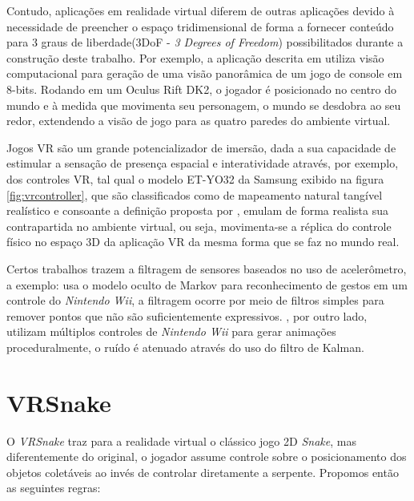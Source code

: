 \documentclass[conference]{IEEEtran}
\begin{document}
 Contudo, aplicações em realidade virtual diferem de outras aplicações devido à necessidade de preencher o espaço tridimensional de forma a fornecer conteúdo para 3 graus de liberdade(3DoF - \textit{3 Degrees of Freedom}) possibilitados durante a construção deste trabalho. Por exemplo, a aplicação descrita em \cite{zund2015unfolding} utiliza visão computacional para geração de uma visão panorâmica de um jogo de console em 8-bits. Rodando em um Oculus Rift DK2, o jogador é posicionado no centro do mundo e à medida que movimenta seu personagem, o mundo se desdobra ao seu redor, extendendo a visão de jogo para as quatro paredes do ambiente virtual.

Jogos VR são um grande potencializador de imersão, dada a sua capacidade de estimular a sensação de presença espacial e interatividade \cite{seibert2017control} através, por exemplo, dos controles VR, tal qual o modelo ET-YO32 da Samsung exibido na figura \ref{fig:vrcontroller}, que são classificados como de mapeamento natural tangível realístico e consoante a definição proposta por \cite{skalski2011mapping}, emulam de forma realista sua contrapartida no ambiente virtual, ou seja, movimenta-se a réplica do controle físico no espaço 3D da aplicação VR da mesma forma que se faz no mundo real.

Certos trabalhos trazem a filtragem de sensores baseados no uso de acelerômetro, a exemplo: \cite{schlomer2008gesture} usa o modelo oculto de Markov para reconhecimento de gestos em um controle do \textit{Nintendo Wii}, a filtragem ocorre por meio de filtros simples para remover pontos que não são suficientemente expressivos. \cite{shiratori2008accelerometer}, por outro lado, utilizam múltiplos controles de \textit{Nintendo Wii} para gerar animações proceduralmente, o ruído é atenuado através do uso do filtro de Kalman.


\section{VRSnake} \label{sec:vrsnake}


O \textit{VRSnake} traz para a realidade virtual o clássico jogo 2D \textit{Snake}, mas diferentemente do original, o jogador assume controle sobre o posicionamento dos objetos coletáveis ao invés de controlar diretamente a serpente. Propomos então as seguintes regras:
\end{document}
